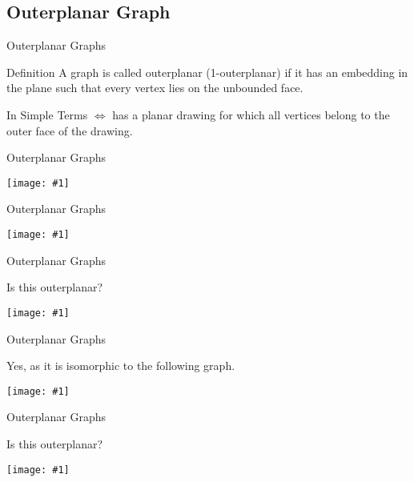 \documentclass{beamer}
\newcommand{\ph}[1]{
    \texttt{[image: \#1]}
}
\begin{document}
\subsection{Outerplanar Graph}

\begin{frame}{Outerplanar Graphs}
\begin{block}{Definition}
    A graph is called outerplanar (1-outerplanar) if it has an embedding in the plane such that every vertex lies on the unbounded face.
\end{block}
\begin{block}{In Simple Terms}
    $\Leftrightarrow$ has a planar drawing for which all vertices belong to the outer face of the drawing.
\end{block}
\end{frame}
\begin{frame}{Outerplanar Graphs}
\begin{example}
    \ph{o1}
\end{example}
\end{frame}

\begin{frame}{Outerplanar Graphs}
\begin{example}
    \ph{o2}
\end{example}
\end{frame}

\begin{frame}{Outerplanar Graphs}
\begin{example}
    Is this outerplanar?

    \ph{o3}


\end{example}
\end{frame}
    
\begin{frame}{Outerplanar Graphs}
\begin{example}
    Yes, as it is isomorphic to the following graph.

    \ph{o4}


\end{example}
\end{frame}


\begin{frame}{Outerplanar Graphs}
\begin{example}
    Is this outerplanar?

    \ph{o5}


\end{example}
\end{frame}
\end{document}
